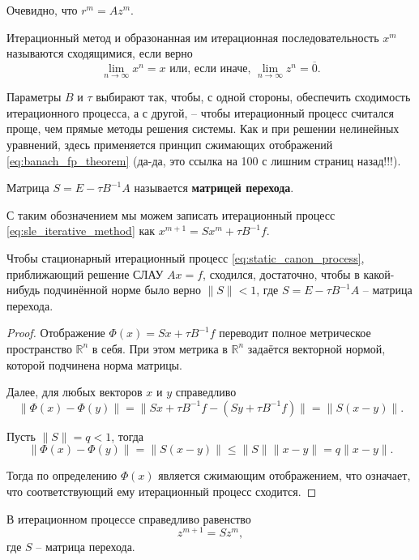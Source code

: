 \documentclass{article}
\begin{document}
Очевидно, что $r^m=Az^m$.

\begin{define}
	Итерационный метод и образонанная им итерационная последовательность
	$x^m$ называются сходящимися, если верно
	\[\lim_{n\to\infty}x^n=x\text{ или, если иначе, }
	\lim_{n\to\infty}z^n=\overline{0}.\]
\end{define}

Параметры $B$ и $\tau$ выбирают так, чтобы, с одной стороны, обеспечить
сходимость итерационного процесса, а с другой, -- чтобы итерационный процесс
считался проще, чем прямые методы решения системы. Как и при решении нелинейных
уравнений, здесь применяется принцип сжимающих отображений
\eqref{eq:banach_fp_theorem} (да-да, это ссылка на 100 с лишним страниц
назад!!!).

\begin{define}
	Матрица $S=E-\tau B^{-1}A$ называется \textbf{матрицей перехода}.
\end{define}

С таким обозначением мы можем записать итерационный процесс
\eqref{eq:sle_iterative_method} как $x^{m+1}=Sx^m+\tau B^{-1}f$.

\begin{theorem}
\label{eq:sle_matrix_norm_cond}
	Чтобы стационарный итерационный процесс
	\eqref{eq:static_canon_process}, приближающий решение СЛАУ $Ax=f$,
	сходился, достаточно, чтобы в какой-нибудь подчинённой норме было верно
	$\|S\|<1$, где $S=E-\tau B^{-1}A$ -- матрица перехода.
\end{theorem}

\begin{proof}
	Отображение $\Phi(x)=Sx+\tau B^{-1}f$ переводит полное метрическое
	пространство $\mathbb R^n$ в себя. При этом метрика в $\mathbb R^n$
	задаётся векторной нормой, которой подчинена норма матрицы.

	Далее, для любых векторов $x$ и $y$ справедливо
	\[\|\Phi(x)-\Phi(y)\|=\|Sx+\tau B^{-1}f-(Sy+\tau B^{-1}f)\|=
	\|S(x-y)\|.\]

	Пусть $\|S\|=q<1$, тогда
	\[\|\Phi(x)-\Phi(y)\|=\|S(x-y)\|\le\|S\|\|x-y\|=q\|x-y\|.\]

	Тогда по определению $\Phi(x)$ является сжимающим отображением, что
	означает, что соответствующий ему итерационный процесс сходится.
\end{proof}

\begin{lemma}
	В итерационном процессе справедливо равенство
	\[z^{m+1}=Sz^m,\]
	где $S$ -- матрица перехода.
\end{lemma}
\end{document}
